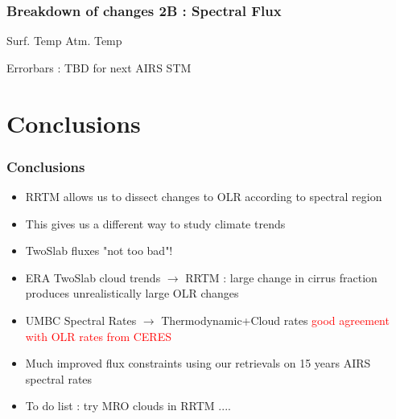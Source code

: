 \documentclass[10pt,t]{beamer}
\begin{document}
\begin{frame}
  \frametitle{Breakdown of changes 2B : Spectral Flux}
  \hspace{0.50in} Surf. Temp  \hspace{1.5in} Atm. Temp \\
  \begin{center}
  \end{center}
 Errorbars : TBD for next AIRS STM
\end{frame}
\section{Conclusions}
\begin{frame}
  \frametitle{Conclusions}
  \begin{itemize}
  \item RRTM allows us to dissect changes to OLR according to spectral region
  \item This gives us a different way to study climate trends
  \item TwoSlab fluxes "not too bad"!
  \item ERA TwoSlab cloud trends $\rightarrow$ RRTM : large change in cirrus fraction
        produces unrealistically large OLR changes
  \item UMBC Spectral Rates $\rightarrow$ Thermodynamic+Cloud rates \textcolor{red}{good agreement
        with OLR rates from CERES}
  \item Much improved flux constraints using our retrievals on 15 years AIRS spectral rates
  \item To do list : try MRO clouds in RRTM ....
  \end{itemize}
\end{frame}
\end{document}
